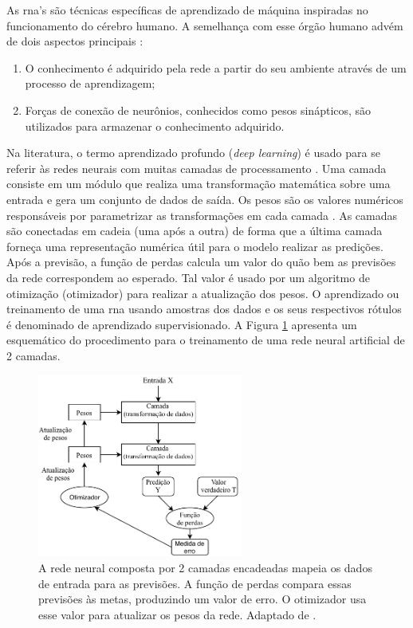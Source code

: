 As \acrshort{rna}'s são técnicas específicas de aprendizado de máquina inspiradas no funcionamento do cérebro humano. A semelhança com esse órgão humano advém de dois aspectos principais \cite{Haykin}:
\begin{enumerate}
	\item O conhecimento é adquirido pela rede a partir do seu ambiente através de um processo de aprendizagem;
	\item Forças de conexão de neurônios, conhecidos como pesos sinápticos, são utilizados para armazenar o conhecimento adquirido.
\end{enumerate}

Na literatura, o termo aprendizado profundo (\textit{deep learning}) é usado para se referir às redes neurais com muitas camadas de processamento \cite{lecun2015deep,bengio2009learning}. Uma camada consiste em um módulo que realiza uma transformação matemática sobre uma entrada e gera um conjunto de dados de saída. Os pesos são os valores numéricos responsáveis por parametrizar as transformações em cada camada \cite{FrancoisDeepLearning}. 
As camadas são conectadas em cadeia (uma após a outra) de forma que a última camada forneça uma representação numérica útil para o modelo realizar as predições. Após a previsão, a função de perdas calcula  um valor do quão bem as previsões da rede correspondem ao esperado. Tal valor é usado por um algoritmo de otimização (otimizador) para realizar a atualização dos pesos. 
O aprendizado ou treinamento de uma \acrshort{rna} usando amostras dos dados e os seus respectivos rótulos é denominado de aprendizado supervisionado. A  Figura \ref{fig:modeloRNA} apresenta um esquemático do procedimento para o treinamento de uma rede neural artificial de 2 camadas.

\begin{figure}[h]
	\centering
	\includegraphics[width=0.6\textwidth]{figuras/modeloRNA.pdf}
	\caption[Principais componentes em uma \acrshort{rna}]{A rede neural composta por 2 camadas encadeadas mapeia os dados de entrada para as previsões. A função de perdas compara essas previsões às metas, produzindo um valor de erro. O otimizador usa esse valor para atualizar os pesos da rede. Adaptado de \cite{FrancoisDeepLearning}.}
	\label{fig:modeloRNA}
\end{figure}


